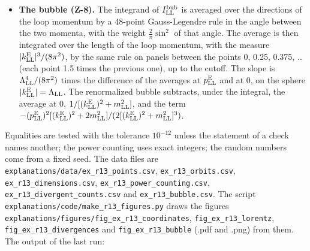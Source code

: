 \documentclass[
  10pt,
]{article}
\begin{document}
\begin{itemize}
  some choice of the signs adds up to zero.
\item
  \textbf{The bubble (Z-8).} The integrand of \(I^{\rm bub}_{\rm LL}\)
  is averaged over the directions of the loop momentum by a 48-point
  Gauss-Legendre rule in the angle between the two momenta, with the
  weight \(\tfrac2\pi\sin^2\) of that angle. The average is then
  integrated over the length of the loop momentum, with the measure
  \(\lvert k^{\rm E}_{\rm LL}\rvert^3/(8\pi^2)\), by the same rule on
  panels between the points 0, 0.25, 0.375, \ldots{} (each point 1.5
  times the previous one), up to the cutoff. The slope is
  \(\Lambda_{\rm LL}^4/(8\pi^2)\) times the difference of the averages
  at \(p^{\rm E}_{\rm LL}\) and at 0, on the sphere
  \(\lvert k^{\rm E}_{\rm LL}\rvert=\Lambda_{\rm LL}\). The renormalized
  bubble subtracts, under the integral, the average at 0,
  \(1/[(k^{\rm E}_{\rm LL})^2+m_{\rm LL}^2]\), and the term
  \(-(p^{\rm E}_{\rm LL})^2[(k^{\rm E}_{\rm LL})^2+2m_{\rm LL}^2]/(2[(k^{\rm E}_{\rm LL})^2+m_{\rm LL}^2]^3)\).
\end{itemize}

Equalities are tested with the tolerance \(10^{-12}\) unless the
statement of a check names another; the power counting uses exact
integers; the random numbers come from a fixed seed. The data files are
\texttt{explanations/data/ex\_r13\_points.csv},
\texttt{ex\_r13\_orbits.csv}, \texttt{ex\_r13\_dimensions.csv},
\texttt{ex\_r13\_power\_counting.csv},
\texttt{ex\_r13\_divergent\_counts.csv} and
\texttt{ex\_r13\_bubble.csv}. The script
\texttt{explanations/code/make\_r13\_figures.py} draws the figures
\texttt{explanations/figures/fig\_ex\_r13\_coordinates},
\texttt{fig\_ex\_r13\_lorentz}, \texttt{fig\_ex\_r13\_divergences} and
\texttt{fig\_ex\_r13\_bubble} (.pdf and .png) from them. The output of
the last run:
\end{document}
